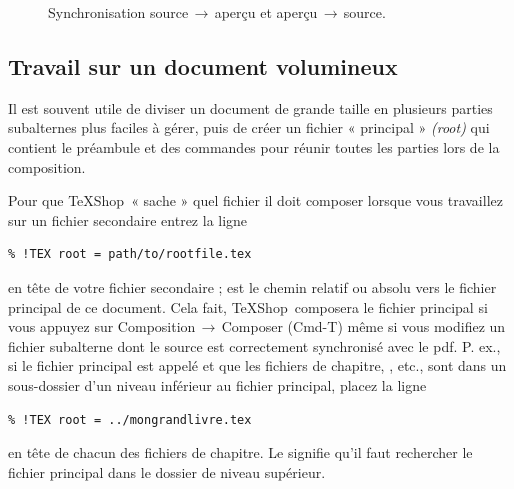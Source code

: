 \documentclass[11pt,french]{article}
\newcommand{\TS}{\textsf{\TeX Shop}}
\newcommand{\acr}[1]{\textsf{#1}}
\newcommand{\cmd}[1]{\textsf{#1}}
\newcommand{\mnu}[1]{\textsf{#1}}
\newcommand{\To}{\,\(\to\)\,}
\begin{document}
\begin{figure}
\centering
{}\qquad{}
\caption{Synchronisation source\To aperçu et aperçu\To source.\label{fig:SourcePreviewSync}}
\end{figure}

\subsection{Travail sur un document volumineux}

Il est souvent utile de diviser un document de grande taille en plusieurs parties subalternes plus faciles à gérer, puis de créer un fichier « principal » \emph{(root)} qui contient le préambule et des commandes \verb|| pour réunir toutes les parties lors de la composition.

Pour que \TS\ « sache » quel fichier il doit composer lorsque vous travaillez sur un fichier secondaire entrez la ligne \begin{verbatim}
% !TEX root = path/to/rootfile.tex
\end{verbatim}
en tête de votre fichier secondaire ;  est le chemin relatif ou absolu vers le fichier principal de ce document. Cela fait, \TS\ composera le fichier principal si vous appuyez sur \mnu{Composition}\To\mnu{Composer} (\cmd{Cmd-T}) même si vous modifiez un fichier subalterne dont le source est correctement synchronisé avec le \acr{pdf}. P. ex., si le fichier principal est appelé  et que les fichiers de chapitre, , etc., sont dans un sous-dossier  d'un niveau inférieur au fichier principal, placez la ligne
\begin{verbatim}
% !TEX root = ../mongrandlivre.tex
\end{verbatim}
en tête de chacun des fichiers de chapitre. Le  signifie qu'il faut rechercher le fichier principal dans le dossier de niveau supérieur.
\end{document}
